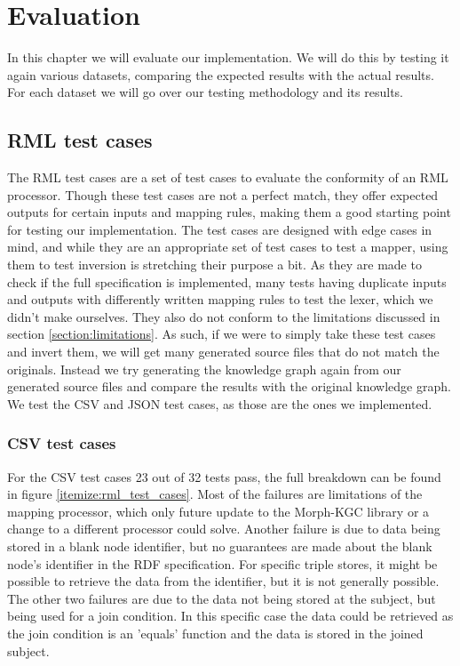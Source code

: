 \chapter{Evaluation}
\label{chapter:evaluation}
In this chapter we will evaluate our implementation. We will do this by testing it again various datasets, comparing the expected results with the actual results. For each dataset we will go over our testing methodology and its results.

\section{RML test cases}
\label{section:rml_test_cases}
The RML test cases \citep{rml-test-cases} are a set of test cases to evaluate the conformity of an RML processor. Though these test cases are not a perfect match, they offer expected outputs for certain inputs and mapping rules, making them a good starting point for testing our implementation. The test cases are designed with edge cases in mind, and while they are an appropriate set of test cases to test a mapper, using them to test inversion is stretching their purpose a bit. As they are made to check if the full specification is implemented, many tests having duplicate inputs and outputs with differently written mapping rules to test the lexer, which we didn't make ourselves. They also do not conform to the limitations discussed in section \ref{section:limitations}. As such, if we were to simply take these test cases and invert them, we will get many generated source files that do not match the originals. Instead we try generating the knowledge graph again from our generated source files and compare the results with the original knowledge graph. We test the CSV and JSON test cases, as those are the ones we implemented.

\subsection{CSV test cases}
For the CSV test cases 23 out of 32 tests pass, the full breakdown can be found in figure \ref{itemize:rml_test_cases}. Most of the failures are limitations of the mapping processor, which only future update to the Morph-KGC library or a change to a different processor could solve. Another failure is due to data being stored in a blank node identifier, but no guarantees are made about the blank node's identifier in the RDF specification. For specific triple stores, it might be possible to retrieve the data from the identifier, but it is not generally possible. The other two failures are due to the data not being stored at the subject, but being used for a join condition. In this specific case the data could be retrieved as the join condition is an 'equals' function and the data is stored in the joined subject.

